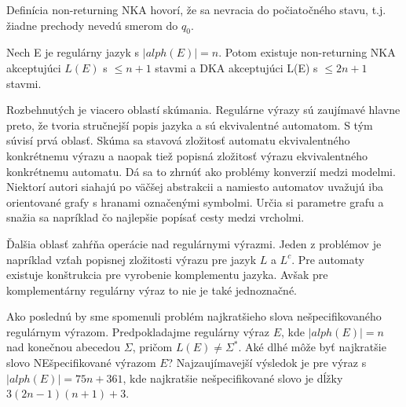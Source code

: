 Definícia non-returning NKA hovorí, že sa nevracia do počiatočného stavu, t.j. žiadne prechody nevedú smerom do $q_0$.

\begin{veta}[Theorem 10]
Nech E je regulárny jazyk s $|alph(E)| = n$. Potom existuje non-returning NKA akceptujúci $L(E)$ s $\leq n+1$ stavmi a DKA akceptujúci L(E) s $\leq 2n+1$ stavmi.
\end{veta}

Rozbehnutých je viacero oblastí skúmania. Regulárne výrazy sú zaujímavé hlavne preto, že tvoria stručnejší popis jazyka a sú ekvivalentné automatom. S tým súvisí prvá oblasť. Skúma sa stavová zložitosť automatu ekvivalentného konkrétnemu výrazu a naopak tiež popisná zložitosť výrazu ekvivalentného konkrétnemu automatu. Dá sa to zhrnúť ako problémy konverzií medzi modelmi. Niektorí autori siahajú po väčšej abstrakcii a namiesto automatov uvažujú iba orientované grafy s hranami označenými symbolmi. Určia si parametre grafu a snažia sa napríklad čo najlepšie popísať cesty medzi vrcholmi.

Ďalšia oblasť zahŕňa operácie nad regulárnymi výrazmi. Jeden z problémov je napríklad vzťah popisnej zložitosti výrazu pre jazyk $L$ a $L^c$. Pre automaty existuje konštrukcia pre vyrobenie komplementu jazyka. Avšak pre komplementárny regulárny výraz to nie je také jednoznačné.

Ako poslednú by sme spomenuli problém najkratšieho slova nešpecifikovaného re\-gu\-lár\-nym výrazom. Predpokladajme regulárny výraz $E$, kde $|alph(E)|=n$ nad konečnou abecedou $\Sigma$, pričom $L(E)\neq \Sigma^*$. Aké dlhé môže byť najkratšie slovo NEšpecifikované výrazom $E$? Najzaujímavejší výsledok je pre výraz s $|alph(E)| = 75n + 361$, kde naj\-krat\-šie nešpecifikované slovo je dĺžky $3(2 n - 1)(n + 1) + 3$.
